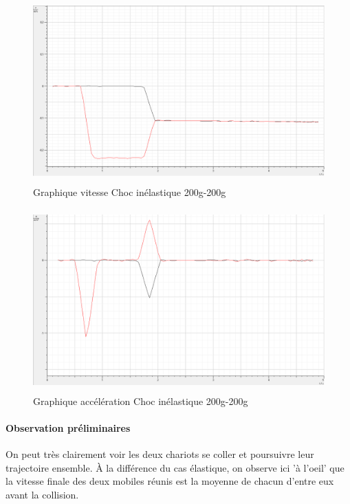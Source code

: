 \begin{figure}[h]
    \caption[Graphique vitesse Choc inélastique 200g-200g]{Graphique vitesse Choc inélastique 200g-200g}
    \centering
    \includegraphics[height=19em]{Data/200-200inela02v.png}
\end{figure}

\newpage

\begin{figure}[h]
    \caption[Graphique accélération Choc inélastique 200g-200g]{Graphique accélération Choc inélastique 200g-200g}
    \centering
    \includegraphics[height=19em]{Data/200-200inela02a.png}
\end{figure}

\paragraph{Observation préliminaires}
On peut très clairement voir les deux chariots se coller et poursuivre leur trajectoire ensemble.
À la différence du cas élastique, on observe ici 'à l'oeil' que la vitesse finale des deux mobiles réunis est la moyenne de chacun d'entre eux avant la collision.

